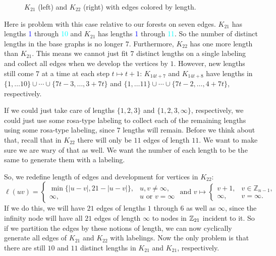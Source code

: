 \begin{figure}[H]
\begin{center}
\begin{tikzpicture}[scale=2,
        dot/.style={circle, fill=black, minimum size=2pt, inner sep=0pt},
        lbl/.style={draw=none, fill=none, inner sep=0pt, anchor=center}
      ]
      \end{tikzpicture}
    \end{center}
    \caption{$K_{21}$ (left) and $K_{22}$ (right) with edges colored by length.}
    \label{fig:K21K22colored}
  \end{figure}
  Here is problem with this case relative to our forests on seven edges. $K_{21}$ has lengths \textcolor{blue}{1} through \textcolor{cyan}{10} and $K_{21}$ has lengths \textcolor{blue}{1} through \textcolor{cyan}{11}. So the number of distinct lengths in the base graphs is no longer $7$. Furthermore, $K_{22}$ has one more length than $K_{21}$. This means we cannot just fit $7$ distinct lengths on a single labeling and collect all edges when we develop the vertices by $1$. However, new lengths still come $7$ at a time at each step $t\mapsto t+1$: $K_{14t+7}$ and $K_{14t+8}$ have lengths in $\{1,\hdots 10\}\cup \cdots\cup\{7t-3,\hdots,3+7t\}$ and $\{1,\hdots 11\}\cup \cdots\cup\{7t-2,\hdots,4+7t\}$, respectively.

  If we could just take care of lengths $\{1,2,3\}$ and $\{1,2,3,\infty \}$, respectively, we could just use some rosa-type labeling to collect each of the remaining lengths using some rosa-type labeling, since $7$ lengths will remain. Before we think about that, recall that in $K_{22}$ there will only be $11$ edges of length $11$. We want to make sure we are wary of that as well. We want the number of each length to be the same to generate them with a labeling.

 So, we redefine length of edges and development for vertices in $K_{22}$:
$$\ell(uv)=\begin{cases}\min\{|u-v|,21-|u-v|\}, & u,v\neq \infty, \\ \infty, & u\text{ or }v=\infty \end{cases} \text{ and }v\mapsto 
\begin{cases}
  v+1,&v\in\mathbb{Z}_{n-1},\\
  \infty,        &v=\infty.
  \end{cases}$$
  If we do this, we will have $21$ edges of lengths $1$ through $6$ as well as $\infty$, since the infinity node will have all $21$ edges of length $\infty$ to nodes in $\ZZ_{21}$ incident to it. So if we partition the edges by these notions of length, we can now cyclically generate all edges of $K_{21}$ and $K_{22}$ with labelings. Now the only problem is that there are still $10$ and $11$ distinct lengths in $K_{21}$ and $K_{21}$, respectively.

